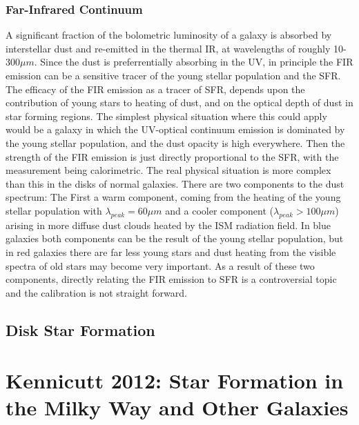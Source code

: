 \documentclass{literature}
\begin{document}
\subsubsection{Far-Infrared Continuum}
A significant fraction of the bolometric luminosity of a galaxy is absorbed by interstellar dust and re-emitted in the thermal IR, at wavelengths of roughly 10-300$\mu m$. Since the dust is preferrentially absorbing in the UV, in principle the FIR emission can be a sensitive tracer of the young stellar population and the SFR. The efficacy of the FIR emission as a tracer of SFR, depends upon the contribution of young stars to heating of dust, and on the optical depth of dust in star forming regions. The simplest physical situation where this could apply would be a galaxy in which the UV-optical continuum emission is dominated by the young stellar population, and the dust opacity is high everywhere. Then the strength of the FIR emission is just directly proportional to the SFR, with the measurement being calorimetric. The real physical situation is more complex than this in the disks of normal galaxies. There are two components to the dust spectrum: The First a warm component, coming from the heating of the young stellar population with $\lambda _{peak} = 60\mu m$ and a cooler component ($\lambda _{peak} > 100\mu m$) arising in more diffuse dust clouds heated by the ISM radiation field. In blue galaxies both components can be the result of the young stellar population, but in red galaxies there are far less young stars and dust heating from the visible spectra of old stars may become very important. As a result of these two components, directly relating the FIR emission to SFR is a controversial topic and the calibration is not straight forward.
\subsection{Disk Star Formation}







\section{Kennicutt 2012: Star Formation in the Milky Way and Other Galaxies}
\end{document}
